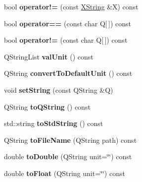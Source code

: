 \begin{DoxyCompactItemize}
\item 
\mbox{\label{class_x_string_a31dd61843c4ce76719e8fa713638d37e}} 
bool {\bfseries operator!=} (const \hyperlink{class_x_string}{X\+String} \&X) const
\item 
\mbox{\label{class_x_string_a28e20e952e990c773f8adf1d270b21d9}} 
bool {\bfseries operator==} (const char Q\mbox{[}$\,$\mbox{]}) const
\item 
\mbox{\label{class_x_string_a158da83e9772316b0e92137184f252ec}} 
bool {\bfseries operator!=} (const char Q\mbox{[}$\,$\mbox{]}) const
\item 
\mbox{\label{class_x_string_a3a245578258a0b155d236b54873ad101}} 
Q\+String\+List {\bfseries val\+Unit} () const
\item 
\mbox{\label{class_x_string_a36b32592820c457d82a5409a783468ef}} 
Q\+String {\bfseries convert\+To\+Default\+Unit} () const
\item 
\mbox{\label{class_x_string_ac5eea84eb1377a0ab5325fd6806bf0bd}} 
void {\bfseries set\+String} (const Q\+String \&Q)
\item 
\mbox{\label{class_x_string_ac7213fe4b5471b90df48dc3d7e68f5fc}} 
Q\+String {\bfseries to\+Q\+String} () const
\item 
\mbox{\label{class_x_string_afe6f924e070502e27ba2ff9c6be8f8f6}} 
std\+::string {\bfseries to\+Std\+String} () const
\item 
\mbox{\label{class_x_string_a7789e911d2924620ea79bf50c5560ed6}} 
Q\+String {\bfseries to\+File\+Name} (Q\+String path) const
\item 
\mbox{\label{class_x_string_af74ba9057f5823465ce54c39735fef74}} 
double {\bfseries to\+Double} (Q\+String unit=\char`\"{}\char`\"{}) const
\item 
\mbox{\label{class_x_string_a8ad304c4c45628a42ac9aad87001a673}} 
double {\bfseries to\+Float} (Q\+String unit=\char`\"{}\char`\"{}) const
\item 

\end{DoxyCompactItemize}
